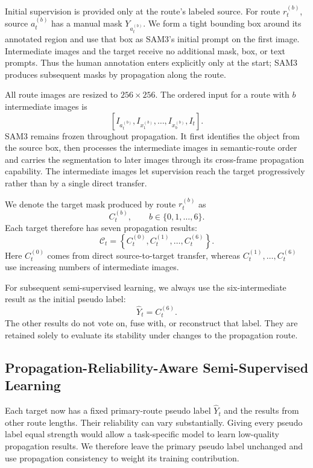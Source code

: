 \documentclass[a4paper,fleqn]{cas-dc}
\begin{document}
Initial supervision is provided only at the route's labeled source. For route $r_t^{(b)}$, source $a_t^{(b)}$ has a manual mask $Y_{a_t^{(b)}}$. We form a tight bounding box around its annotated region and use that box as SAM3's initial prompt on the first image. Intermediate images and the target receive no additional mask, box, or text prompts. Thus the human annotation enters explicitly only at the start; SAM3 produces subsequent masks by propagation along the route.

All route images are resized to $256\times256$. The ordered input for a route with $b$ intermediate images is
\begin{equation}
\left[I_{a_t^{(b)}},I_{x_1^{(b)}},\ldots,
I_{x_b^{(b)}},I_t\right].
\end{equation}
SAM3 remains frozen throughout propagation. It first identifies the object from the source box, then processes the intermediate images in semantic-route order and carries the segmentation to later images through its cross-frame propagation capability. The intermediate images let supervision reach the target progressively rather than by a single direct transfer.

We denote the target mask produced by route $r_t^{(b)}$ as
\begin{equation}
C_t^{(b)},\qquad b\in\{0,1,\ldots,6\}.
\end{equation}
Each target therefore has seven propagation results:
\begin{equation}
\mathcal{C}_t=
\left\{C_t^{(0)},C_t^{(1)},\ldots,C_t^{(6)}\right\}.
\end{equation}
Here $C_t^{(0)}$ comes from direct source-to-target transfer, whereas $C_t^{(1)},\ldots,C_t^{(6)}$ use increasing numbers of intermediate images.

For subsequent semi-supervised learning, we always use the six-intermediate result as the initial pseudo label:
\begin{equation}
\widehat{Y}_t=C_t^{(6)}.
\end{equation}
The other results do not vote on, fuse with, or reconstruct that label. They are retained solely to evaluate its stability under changes to the propagation route.

\subsection{Propagation-Reliability-Aware Semi-Supervised Learning}
\label{sec:reliability-learning}

Each target now has a fixed primary-route pseudo label $\widehat{Y}_t$ and the results from other route lengths. Their reliability can vary substantially. Giving every pseudo label equal strength would allow a task-specific model to learn low-quality propagation results. We therefore leave the primary pseudo label unchanged and use propagation consistency to weight its training contribution.
\end{document}
